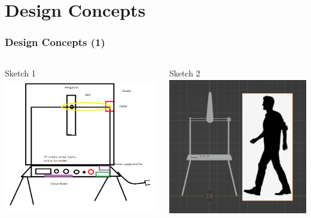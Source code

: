 \documentclass[aspectratio=169]{beamer}
\begin{document}
\section{Design Concepts}
\begin{frame}
    \frametitle{Design Concepts (1)}

    \begin{columns}
        \begin{column}{0.48\textwidth}
            \begin{block}{Sketch 1}
                \includegraphics[height=6cm]{../../../Notes/Sketches/Basic Mock-Up Sketch.png}
            \end{block}
        \end{column}

        \begin{column}{0.48\textwidth}
            \begin{block}{Sketch 2}
                \includegraphics[height=6cm]{Scale}
            \end{block}
        \end{column}
    \end{columns}


\end{frame}
\end{document}
